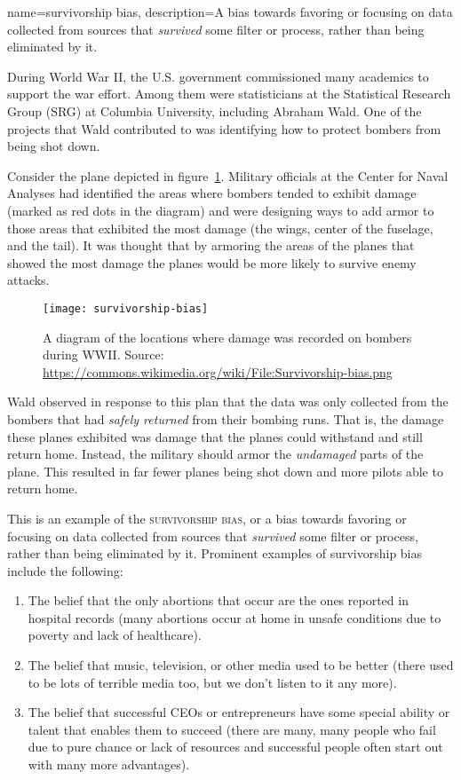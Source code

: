 {
name=survivorship bias,
description={A bias towards favoring or focusing on data collected from sources that \emph{survived} some filter or process, rather than being eliminated by it.}
}

During World War II, the U.S. government commissioned many academics to support the war effort. Among them were statisticians at the Statistical Research Group (SRG) at Columbia University, including Abraham Wald. One of the projects that Wald contributed to was identifying how to protect bombers from being shot down.

Consider the plane depicted in figure~\ref{fig:survivorplane}. Military officials at the Center for Naval Analyses had identified the areas where bombers tended to exhibit damage (marked as red dots in the diagram) and were designing ways to add armor to those areas that exhibited the most damage (the wings, center of the fuselage, and the tail). It was thought that by armoring the areas of the planes that showed the most damage the planes would be more likely to survive enemy attacks.

\begin{figure}[!ht]
\texttt{[image: survivorship-bias]}
\caption{A diagram of the locations where damage was recorded on bombers during WWII. Source: \url{https://commons.wikimedia.org/wiki/File:Survivorship-bias.png}}
\label{fig:survivorplane}
\end{figure}

Wald observed in response to this plan that the data was only collected from the bombers that had \emph{safely returned} from their bombing runs. That is, the damage these planes exhibited was damage that the planes could withstand and still return home. Instead, the military should armor the \emph{undamaged} parts of the plane. This resulted in far fewer planes being shot down and more pilots able to return home.

This is an example of the \textsc{\gls{survivorship bias}}, or a bias towards favoring or focusing on data collected from sources that \emph{survived} some filter or process, rather than being eliminated by it. Prominent examples of survivorship bias include the following:

\begin{enumerate}
\item The belief that the only abortions that occur are the ones reported in hospital records (many abortions occur at home in unsafe conditions due to poverty and lack of healthcare).
\item The belief that music, television, or other media used to be better (there used to be lots of terrible media too, but we don't listen to it any more).
\item The belief that successful CEOs or entrepreneurs have some special ability or talent that enables them to succeed (there are many, many people who fail due to pure chance or lack of resources and successful people often start out with many more advantages).
\end{enumerate}

